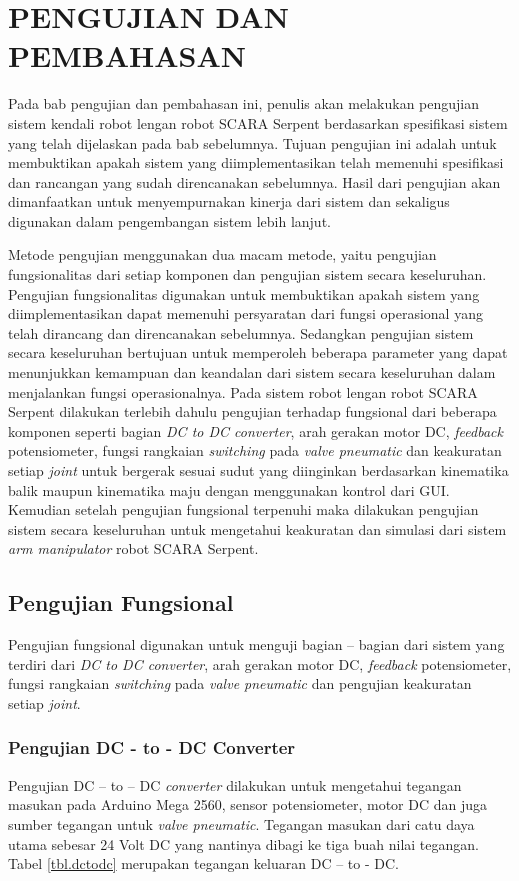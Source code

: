 
\chapter{PENGUJIAN DAN PEMBAHASAN}
Pada bab pengujian dan pembahasan ini, penulis akan melakukan pengujian sistem kendali robot lengan robot SCARA Serpent berdasarkan spesifikasi sistem yang telah dijelaskan pada bab sebelumnya. Tujuan pengujian ini adalah untuk membuktikan apakah sistem yang diimplementasikan telah memenuhi spesifikasi dan rancangan yang sudah direncanakan sebelumnya. Hasil dari pengujian akan dimanfaatkan untuk menyempurnakan kinerja dari sistem dan sekaligus digunakan dalam pengembangan sistem lebih lanjut. 

Metode pengujian menggunakan dua macam metode, yaitu pengujian fungsionalitas dari setiap komponen dan pengujian sistem secara keseluruhan. Pengujian fungsionalitas digunakan untuk membuktikan apakah sistem yang diimplementasikan dapat memenuhi persyaratan dari fungsi operasional yang telah dirancang dan direncanakan sebelumnya. Sedangkan pengujian sistem secara keseluruhan bertujuan untuk memperoleh beberapa parameter yang dapat menunjukkan kemampuan dan keandalan dari sistem secara keseluruhan dalam menjalankan fungsi operasionalnya. Pada sistem robot lengan robot SCARA Serpent dilakukan terlebih dahulu pengujian terhadap fungsional dari beberapa komponen seperti bagian \textit{DC to DC converter}, arah gerakan motor DC, \textit{feedback} potensiometer, fungsi rangkaian \textit{switching} pada \textit{valve pneumatic} dan keakuratan setiap \textit{joint} untuk bergerak sesuai sudut yang diinginkan berdasarkan kinematika balik maupun kinematika maju dengan menggunakan kontrol dari GUI.  Kemudian setelah pengujian fungsional terpenuhi maka dilakukan pengujian sistem secara keseluruhan untuk mengetahui keakuratan dan simulasi dari sistem \textit{arm manipulator} robot SCARA Serpent.

\section{Pengujian Fungsional}
Pengujian fungsional digunakan untuk menguji bagian – bagian dari sistem yang terdiri dari \textit{DC to DC converter}, arah gerakan motor DC, \textit{feedback} potensiometer, fungsi rangkaian \textit{switching} pada \textit{valve pneumatic} dan pengujian keakuratan setiap \textit{joint}. 

\subsection{Pengujian DC - to - DC Converter}
Pengujian DC – to – DC \textit{converter} dilakukan untuk mengetahui tegangan masukan pada Arduino Mega 2560, sensor potensiometer, motor DC dan juga sumber tegangan untuk\textit{ valve pneumatic}. Tegangan masukan dari catu daya utama sebesar 24 Volt DC yang nantinya dibagi ke tiga buah nilai tegangan. Tabel \ref{tbl.dctodc} merupakan tegangan keluaran DC – to - DC.


